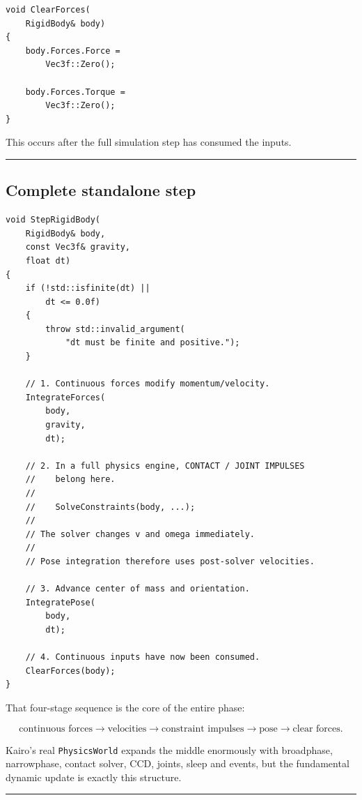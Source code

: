 \begin{verbatim}
void ClearForces(
    RigidBody& body)
{
    body.Forces.Force =
        Vec3f::Zero();

    body.Forces.Torque =
        Vec3f::Zero();
}
\end{verbatim}

This occurs after the full simulation step has consumed the inputs.

\begin{center}\rule{0.5\linewidth}{0.5pt}\end{center}

\subsection{Complete standalone step}\label{06-engine-ii-ch039-complete-standalone-step}

\begin{verbatim}
void StepRigidBody(
    RigidBody& body,
    const Vec3f& gravity,
    float dt)
{
    if (!std::isfinite(dt) ||
        dt <= 0.0f)
    {
        throw std::invalid_argument(
            "dt must be finite and positive.");
    }

    // 1. Continuous forces modify momentum/velocity.
    IntegrateForces(
        body,
        gravity,
        dt);

    // 2. In a full physics engine, CONTACT / JOINT IMPULSES
    //    belong here.
    //
    //    SolveConstraints(body, ...);
    //
    // The solver changes v and omega immediately.
    //
    // Pose integration therefore uses post-solver velocities.

    // 3. Advance center of mass and orientation.
    IntegratePose(
        body,
        dt);

    // 4. Continuous inputs have now been consumed.
    ClearForces(body);
}
\end{verbatim}

That four-stage sequence is the core of the entire phase:

\[
\boxed{
\text{continuous forces}
\rightarrow
\text{velocities}
\rightarrow
\text{constraint impulses}
\rightarrow
\text{pose}
\rightarrow
\text{clear forces}.
}
\]

Kairo's real \texttt{PhysicsWorld} expands the middle enormously with broadphase, narrowphase, contact solver, CCD, joints, sleep and events, but the fundamental dynamic update is exactly this structure.

\begin{center}\rule{0.5\linewidth}{0.5pt}\end{center}

